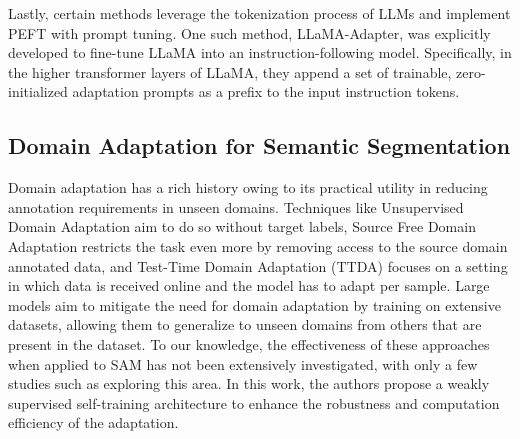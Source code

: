 Lastly, certain methods leverage the tokenization process of LLMs and implement PEFT with prompt tuning. One such method, LLaMA-Adapter, was explicitly developed to fine-tune LLaMA into an instruction-following model. Specifically, in the higher transformer layers of LLaMA, they append a set of trainable, zero-initialized adaptation prompts as a prefix to the input instruction tokens. 

\subsection{Domain Adaptation for Semantic Segmentation}
Domain adaptation has a rich history owing to its practical utility in reducing annotation requirements in unseen domains. Techniques like Unsupervised Domain Adaptation aim to do so without target labels, Source Free Domain Adaptation restricts the task even more by removing access to the source domain annotated data, and Test-Time Domain Adaptation (TTDA) focuses on a setting in which data is received online and the model has to adapt per sample. Large models aim to mitigate the need for domain adaptation by training on extensive datasets, allowing them to generalize to unseen domains from others that are present in the dataset. To our knowledge, the effectiveness of these approaches when applied to SAM has not been extensively investigated, with only a few studies such as \cite{zhang2023improving} exploring this area. In this work, the authors propose a weakly supervised self-training architecture to enhance the robustness and computation efficiency of the adaptation.
